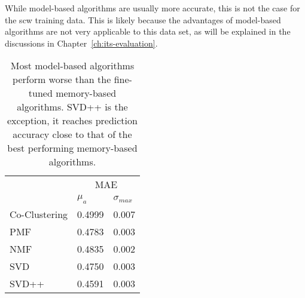 While model-based algorithms are usually more accurate, this is not the case for the \gls{scw} training data.
This is likely because the advantages of model-based algorithms are not very applicable to this data set, as will be explained in the discussions in Chapter~\ref{ch:its-evaluation}.

\begin{table}
    \centering
    \caption[Prediction performance of model-based algorithms]{Most model-based algorithms perform worse than the fine-tuned memory-based algorithms. SVD++ is the exception, it reaches prediction accuracy close to that of the best performing memory-based algorithms.}
    \label{tab:model-based}
    \small
    \begin{tabular}{l ll}
                 & \multicolumn{2}{c}{MAE}\\
    \cline{2-3} 
    & $\mu_a$ & $\sigma_{max}$\\
    \hline
Co-Clustering     & 0.4999 & 0.007 \\
PMF               & 0.4783 & 0.003 \\
NMF               & 0.4835 & 0.002 \\
SVD               & 0.4750 & 0.003 \\
SVD++             & 0.4591 & 0.003 \\
    \end{tabular}
\end{table}